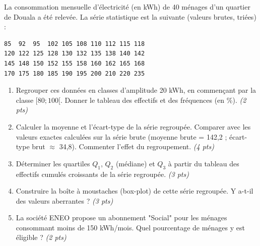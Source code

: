\documentclass[11pt]{article}
\begin{document}
\begin{exercice}
La consommation mensuelle d'électricité (en kWh) de \num{40} ménages d'un quartier de Douala a été relevée. La série statistique est la suivante (valeurs brutes, triées) :
\begin{center}
\begin{verbatim}
85  92  95  102 105 108 110 112 115 118
120 122 125 128 130 132 135 138 140 142
145 148 150 152 155 158 160 162 165 168
170 175 180 185 190 195 200 210 220 235
\end{verbatim}
\end{center}

\begin{enumerate}
    \item Regrouper ces données en classes d'amplitude 20 kWh, en commençant par la classe $[80; 100[$. Donner le tableau des effectifs et des fréquences (en \%). \textit{(2 pts)}
    \item Calculer la moyenne et l'écart-type de la série regroupée. Comparer avec les valeurs exactes calculées sur la série brute (moyenne brute = 142,2 ; écart-type brut $\approx$ 34,8). Commenter l'effet du regroupement. \textit{(4 pts)}
    \item Déterminer les quartiles $Q_1$, $Q_2$ (médiane) et $Q_3$ à partir du tableau des effectifs cumulés croissants de la série regroupée. \textit{(3 pts)}
    \item Construire la boîte à moustaches (box-plot) de cette série regroupée. Y a-t-il des valeurs aberrantes ? \textit{(3 pts)}
    \item La société ENEO propose un abonnement "Social" pour les ménages consommant moins de 150 kWh/mois. Quel pourcentage de ménages y est éligible ? \textit{(2 pts)}
\end{enumerate}
\end{exercice}
\end{document}
